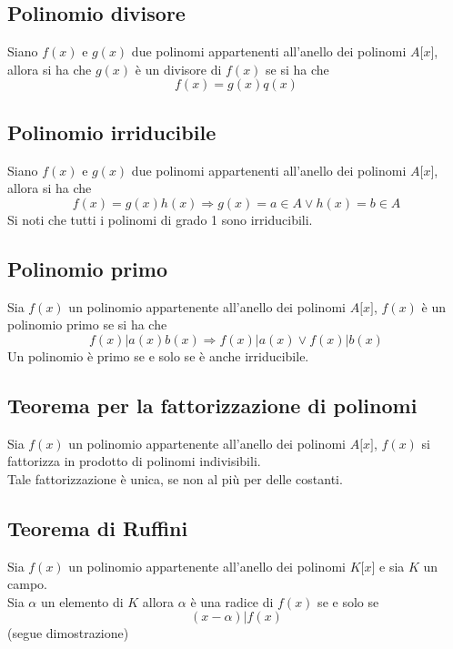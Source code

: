 \begin{flushleft}
\subsection{Polinomio divisore}
Siano $f(x)$ e $g(x)$ due polinomi appartenenti all'anello dei polinomi $A\big[x\big]$, allora si ha che $g(x)$ è un divisore di $f(x)$ se si ha che
\[f(x) = g(x)q(x)\]



\subsection{Polinomio irriducibile}
Siano $f(x)$ e $g(x)$ due polinomi appartenenti all'anello dei polinomi $A\big[x\big]$, allora si ha che
\[f(x) = g(x)h(x)\Rightarrow g(x) = a\in A \vee h(x) = b\in A\]
Si noti che tutti i polinomi di grado 1 sono irriducibili.



\subsection{Polinomio primo}
Sia $f(x)$ un polinomio appartenente all'anello dei polinomi $A\big[x\big]$, $f(x)$ è un polinomio primo se si ha che
\[f(x)|a(x)b(x) \Rightarrow f(x)|a(x) \vee f(x)|b(x)\]
Un polinomio è primo se e solo se è anche irriducibile.



\subsection{Teorema per la fattorizzazione di polinomi}
Sia $f(x)$ un polinomio appartenente all'anello dei polinomi $A\big[x\big]$, $f(x)$ si fattorizza in prodotto di polinomi indivisibili.\\
Tale fattorizzazione è unica, se non al più per delle costanti.





\subsection{Teorema di Ruffini}
Sia $f(x)$ un polinomio appartenente all'anello dei polinomi $K\big[x\big]$ e sia $K$ un campo.\\
Sia $\alpha$ un elemento di $K$ allora $\alpha$ è una radice di $f(x)$ se e solo se
\[(x-\alpha)|f(x)\]
(segue dimostrazione)
\\ \vspace{300px}




\end{flushleft}
